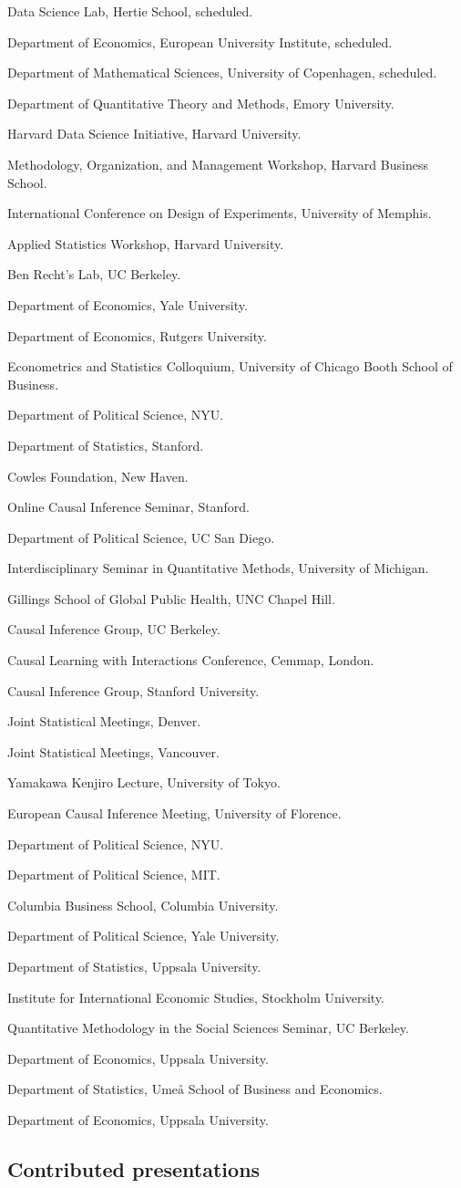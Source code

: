 \documentclass[10pt,letterpaper]{article}
\newenvironment{singledatelist}{
	\begin{list}{}{
		\setlength{\parskip}{0pt}
		\setlength{\itemsep}{4pt}
		\setlength{\parsep}{0.3em}
		\setlength{\leftmargin}{3.5em}
		\setlength{\labelwidth}{3.5em}
		\setlength{\labelsep}{1.5em}
		}
	}{
\end{list}
}
\newcommand{\dateitem}[2][]{\item[{#1}] {#2}}
\begin{document}
	\begin{singledatelist}
		\dateitem[2024]{Data Science Lab, Hertie School, scheduled.}
		\dateitem{Department of Economics, European University Institute, scheduled.}
		\dateitem{Department of Mathematical Sciences, University of Copenhagen, scheduled.}
		\dateitem{Department of Quantitative Theory and Methods, Emory University.}
		\dateitem{Harvard Data Science Initiative, Harvard University.}
		\dateitem[2023]{Methodology, Organization, and Management Workshop, Harvard Business School.}
		\dateitem{International Conference on Design of Experiments, University of Memphis.}
		\dateitem{Applied Statistics Workshop, Harvard University.}
		\dateitem{Ben Recht's Lab, UC Berkeley.}
		\dateitem{Department of Economics, Yale University.}
		\dateitem[2021]{Department of Economics, Rutgers University.}
		\dateitem{Econometrics and Statistics Colloquium, University of Chicago Booth School of Business.}
		\dateitem{Department of Political Science, NYU.}
		\dateitem{Department of Statistics, Stanford.}
		\dateitem{Cowles Foundation, New Haven.}
		\dateitem{Online Causal Inference Seminar, Stanford.}
		\dateitem[2020]{Department of Political Science, UC San Diego.}
		\dateitem{Interdisciplinary Seminar in Quantitative Methods, University of Michigan.}
		\dateitem{Gillings School of Global Public Health, UNC Chapel Hill.}
		\dateitem{Causal Inference Group, UC Berkeley.}
		\dateitem[2019]{Causal Learning with Interactions Conference, Cemmap, London.}
		\dateitem{Causal Inference Group, Stanford University.}
		\dateitem{Joint Statistical Meetings, Denver.}
		\dateitem[2018]{Joint Statistical Meetings, Vancouver.}
		\dateitem{Yamakawa Kenjiro Lecture, University of Tokyo.}
		\dateitem{European Causal Inference Meeting, University of Florence.}
		\dateitem{Department of Political Science, NYU.}
		\dateitem{Department of Political Science, MIT.}
		\dateitem[2016]{Columbia Business School, Columbia University.}
		\dateitem[2015]{Department of Political Science, Yale University.}
		\dateitem{Department of Statistics, Uppsala University.}
		\dateitem{Institute for International Economic Studies, Stockholm University.}
		\dateitem[2014]{Quantitative Methodology in the Social Sciences Seminar, UC Berkeley.}
		\dateitem{Department of Economics, Uppsala University.}
		\dateitem[2013]{Department of Statistics, Umeå School of Business and Economics.}
		\dateitem[2012]{Department of Economics, Uppsala University.}
	\end{singledatelist}


	\subsection*{Contributed presentations}
\end{document}
